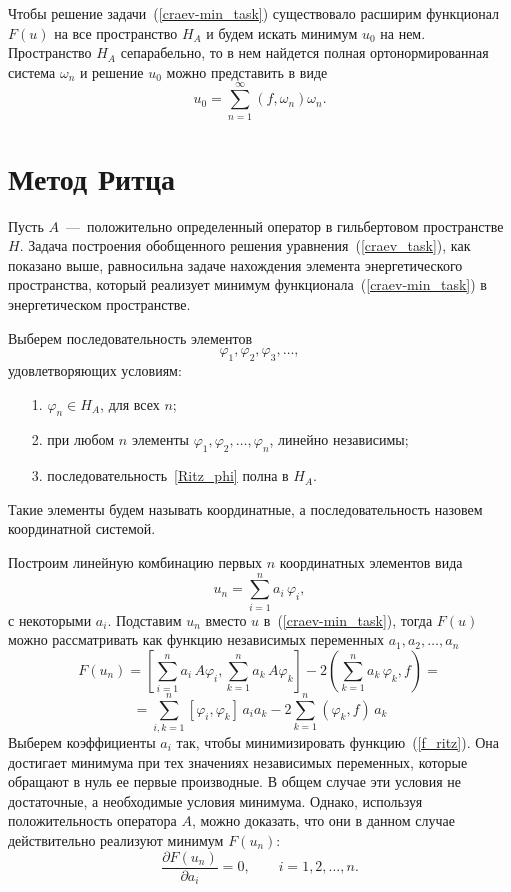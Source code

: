 \documentclass[12pt, a4paper]{article}
\begin{document}
Чтобы решение задачи~(\ref{craev-min_task}) существовало расширим функционал $F(u)$ на все пространство $H_A$ и будем искать минимум $u_0$ на нем.
Пространство $H_A$ сепарабельно, то в нем найдется полная ортонормированная система $\omega_n$ и решение $u_0$ можно представить в виде
\begin{equation}
	\label{craev_ser}
	u_0 = \sum\limits_{n = 1}^{\infty} (f, \omega_n)\omega_n.
\end{equation}

\section{Метод Ритца}
Пусть $A$~---~положительно определенный оператор в гильбертовом  пространстве $H$. Задача построения обобщенного решения уравнения~(\ref{craev_task}),
как показано выше, равносильна задаче нахождения элемента энергетического
пространства, который реализует минимум функционала~(\ref{craev-min_task})
в энергетическом пространстве.

Выберем последовательность элементов
\begin{equation}\label{Ritz_phi}
	\varphi_1, \varphi_2, \varphi_3, \ldots,
\end{equation}
удовлетворяющих условиям:
\begin{itemize}
	\item [1.] $\varphi_n \in H_A$, для всех $n$;
	\item [2.] при любом $n$ элементы $\varphi_1, \varphi_2,  \ldots, \varphi_n$, линейно независимы;
	\item [3.] последовательность~\eqref{Ritz_phi} полна в $H_A$.
\end{itemize}
Такие элементы будем называть координатные, а последовательность назовем координатной системой.

Построим линейную комбинацию первых $n$ координатных элементов вида
\begin{equation}\label{Ritz_un_sum}
	u_n = \sum_{i = 1}^n a_i \, \varphi_i,
\end{equation}
с некоторыми $a_i$. Подставим $u_n$ вместо $u$ в~(\ref{craev-min_task}), тогда $F(u)$ можно рассматривать как функцию
независимых переменных $a_1, a_2, \ldots, a_n$
\begin{equation}
	\label{f_ritz}
	F(u_n) = \left[\sum_{i = 1}^n a_i \, A\varphi_i,
	\sum_{k = 1}^n a_k \, A\varphi_k \right] -
	2\left(\sum_{k = 1}^n a_k \, \varphi_k, f \right) =
\end{equation}
\[
	= \sum_{i,k = 1}^n [\varphi_i, \varphi_k] \, a_i a_k -
	2\sum_{k = 1}^n (\varphi_k, f) \, a_k
\]
Выберем коэффициенты $a_i$ так, чтобы минимизировать функцию~(\ref{f_ritz}). Она достигает минимума при тех значениях независимых переменных, которые обращают в нуль ее первые производные. В общем случае эти условия не достаточные, а необходимые условия минимума. Однако, используя положительность оператора $A$, можно доказать, что они в данном случае действительно реализуют минимум $F(u_n)$:
\begin{equation}\label{system_zero_ritz}
	\frac{\partial F(u_n)}{\partial a_i} = 0, \qquad i = 1, 2, \ldots, n.
\end{equation}
\end{document}

